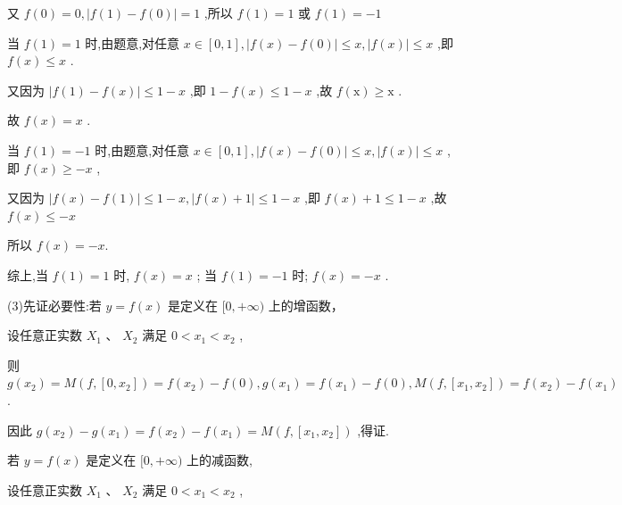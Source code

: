 \documentclass[10pt]{article}
\begin{document}
又 \(f\left( 0\right)  = 0,\left| {f\left( 1\right)  - f\left( 0\right) }\right|  = 1\) ,所以 \(f\left( 1\right)  = 1\) 或 \(f\left( 1\right)  =  - 1\)

当 \(f\left( 1\right)  = 1\) 时,由题意,对任意 \(x \in  \left\lbrack  {0,1}\right\rbrack  ,\left| {f\left( x\right)  - f\left( 0\right) }\right|  \leq  x,\left| {f\left( x\right) }\right|  \leq  x\) ,即 \(f\left( x\right)  \leq  x\) .

又因为 \(\left| {f\left( 1\right)  - f\left( x\right) }\right|  \leq  1 - x\) ,即 \(1 - f\left( x\right)  \leq  1 - x\) ,故 \(f\left( \mathrm{x}\right)  \geq  \mathrm{x}\) .

故 \(f\left( x\right)  = x\) .

当 \(f\left( 1\right)  =  - 1\) 时,由题意,对任意 \(x \in  \left\lbrack  {0,1}\right\rbrack  ,\left| {f\left( x\right)  - f\left( 0\right) }\right|  \leq  x,\left| {f\left( x\right) }\right|  \leq  x\) ,即 \(f\left( x\right)  \geq   - x\) ,

又因为 \(\left| {f\left( x\right)  - f\left( 1\right) }\right|  \leq  1 - x,\left| {f\left( x\right)  + 1}\right|  \leq  1 - x\) ,即 \(f\left( x\right)  + 1 \leq  1 - x\) ,故 \(f\left( x\right)  \leq   - x\)

所以 \(f\left( x\right)  =  - x.\)

综上,当 \(f\left( 1\right)  = 1\) 时, \(f\left( x\right)  = x\) ; 当 \(f\left( 1\right)  =  - 1\) 时; \(f\left( x\right)  =  - x\) .

(3)先证必要性:若 \(y = f\left( x\right)\) 是定义在 \(\lbrack 0, + \infty )\) 上的增函数，

设任意正实数 \({X}_{1}\text{ 、 }{X}_{2}\) 满足 \(0 < {x}_{1} < {x}_{2}\) ,

则 \(g\left( {x}_{2}\right)  = M\left( {f,\left\lbrack  {0,{x}_{2}}\right\rbrack  }\right)  = f\left( {x}_{2}\right)  - f\left( 0\right) , g\left( {x}_{1}\right)  = f\left( {x}_{1}\right)  - f\left( 0\right) , M\left( {f,\left\lbrack  {{x}_{1},{x}_{2}}\right\rbrack  }\right)  = f\left( {x}_{2}\right)  - f\left( {x}_{1}\right)\) .

因此 \(g\left( {x}_{2}\right)  - g\left( {x}_{1}\right)  = f\left( {x}_{2}\right)  - f\left( {x}_{1}\right)  = M\left( {f,\left\lbrack  {{x}_{1},{x}_{2}}\right\rbrack  }\right)\) ,得证.

若 \(y = f\left( x\right)\) 是定义在 \(\lbrack 0, + \infty )\) 上的减函数,

设任意正实数 \({X}_{1}\text{ 、 }{X}_{2}\) 满足 \(0 < {x}_{1} < {x}_{2}\) ,
\end{document}
